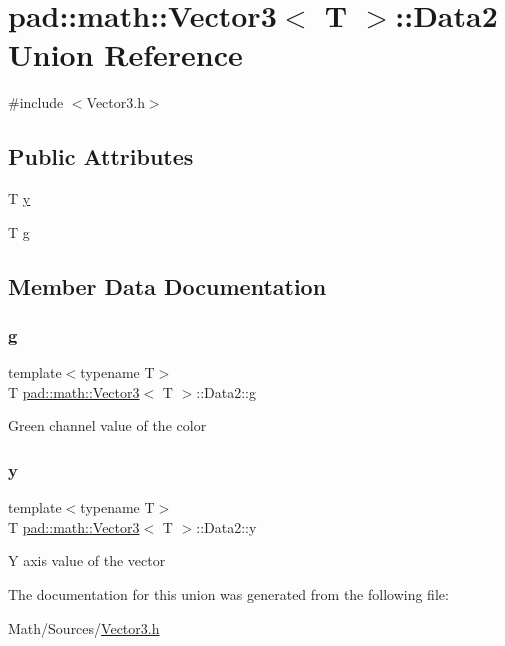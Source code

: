 \hypertarget{unionpad_1_1math_1_1_vector3_1_1_data2}{}\section{pad\+:\+:math\+:\+:Vector3$<$ T $>$\+:\+:Data2 Union Reference}
\label{unionpad_1_1math_1_1_vector3_1_1_data2}


{\ttfamily \#include $<$Vector3.\+h$>$}

\subsection*{Public Attributes}
\begin{DoxyCompactItemize}
\item 
T \mbox{\hyperlink{unionpad_1_1math_1_1_vector3_1_1_data2_aea1dc8d74a24cbeb3c95505ecac01907}{y}}
\item 
T \mbox{\hyperlink{unionpad_1_1math_1_1_vector3_1_1_data2_a821e78beb1a28feb7c6c3b76ae28a4ae}{g}}
\end{DoxyCompactItemize}


\subsection{Member Data Documentation}
\mbox{\label{unionpad_1_1math_1_1_vector3_1_1_data2_a821e78beb1a28feb7c6c3b76ae28a4ae}} 
\subsubsection{\texorpdfstring{g}{g}}
{\footnotesize\ttfamily template$<$typename T$>$ \\
T \mbox{\hyperlink{structpad_1_1math_1_1_vector3}{pad\+::math\+::\+Vector3}}$<$ T $>$\+::Data2\+::g}

Green channel value of the color \mbox{\label{unionpad_1_1math_1_1_vector3_1_1_data2_aea1dc8d74a24cbeb3c95505ecac01907}} 
\subsubsection{\texorpdfstring{y}{y}}
{\footnotesize\ttfamily template$<$typename T$>$ \\
T \mbox{\hyperlink{structpad_1_1math_1_1_vector3}{pad\+::math\+::\+Vector3}}$<$ T $>$\+::Data2\+::y}

Y axis value of the vector 

The documentation for this union was generated from the following file\+:\begin{DoxyCompactItemize}
\item 
Math/\+Sources/\mbox{\hyperlink{_vector3_8h}{Vector3.\+h}}\end{DoxyCompactItemize}
